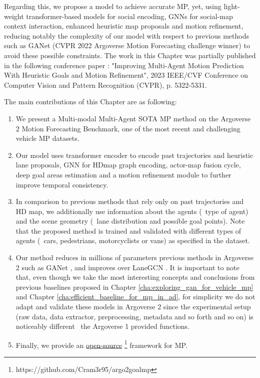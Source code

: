 Regarding this, we propose a model to achieve accurate \ac{MP}, yet, using light-weight transformer-based models for social encoding, \acp{GNN} for social-map context interaction, enhanced heuristic map proposals and motion refinement, reducing notably the complexity of our model with respect to previous methods such as GANet \cite{wang2022ganet} (CVPR 2022 Argoverse Motion Forecasting challenge winner) to avoid these possible constraints. The work in this Chapter was partially published in the following conference paper \cite{gomez2023improving}: "Improving Multi-Agent Motion Prediction With Heuristic Goals and Motion Refinement", 2023 IEEE/CVF Conference on Computer Vision and Pattern Recognition (CVPR), p. 5322-5331. 

The main contributions of this Chapter are as following: 

\begin{enumerate}
	
	\item We present a Multi-modal Multi-Agent \ac{SOTA} \ac{MP} method on the Argoverse 2 Motion Forecasting Benchmark, one of the most recent and challenging vehicle \ac{MP} datasets.
	
	\item Our model uses transformer encoder to encode past trajectories and heuristic lane proposals, \ac{GNN} for \ac{HDmap} graph encoding, actor-map fusion cycle, deep goal areas estimation and a motion refinement module to further improve temporal consistency.
	
	\item In comparison to previous methods that rely only on past trajectories and HD map, we additionally use information about the agents (\eg \ type of agent) and the scene geometry (\eg \ lane distribution and possible goal points). Note that the proposed method is trained and validated with different types of agents (\eg \ cars, pedestrians, motorcyclists or vans) as specified in the dataset.
	
	\item Our method reduces in millions of parameters previous methods in Argoverse 2 such as GANet \cite{wang2022ganet}, and improves over LaneGCN \cite{liang2020learning}. It is important to note that, even though we take the most interesting concepts and conclusions from previous baselines proposed in Chapter \ref{cha:exploring_gan_for_vehicle_mp} and Chapter \ref{cha:efficient_baseline_for_mp_in_ad}, for simplicity we do not adapt and validate these models in Argoverse 2 since the experimental setup (raw data, data extractor, preprocessing, metadata and so forth and so on) is noticeably different \wrt \ the Argoverse 1 provided functions.
	
	\item Finally, we provide an \href{https://github.com/Cram3r95/argo2goalmp}{open-source} \footnote{https://github.com/Cram3r95/argo2goalmp} framework for \ac{MP}.
	
\end{enumerate}


